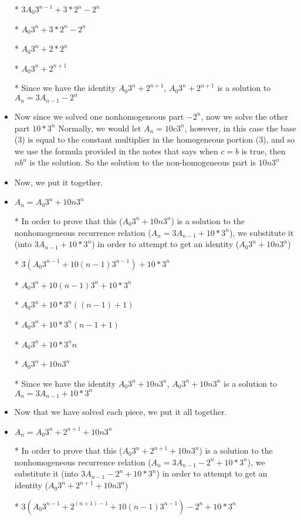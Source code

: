 \documentclass{article}
\begin{document}
\begin{enumerate}
\begin{enumerate}
\begin{itemize}
    \item [*] $3A_{0}3^{n-1}+3*2^{n}-2^{n}$
    \item [*] $A_{0}3^{n}+3*2^{n}-2^{n}$
    \item [*] $A_{0}3^{n}+2*2^{n}$
    \item [*] $A_{0}3^{n}+2^{n+1}$
    \item [*] Since we have the identity $A_{0}3^{n}+2^{n+1}$, $A_{0}3^{n}+2^{n+1}$ is a solution to $A_{n}=3A_{n-1}-2^{n}$
    \item Now since we solved one nonhomogeneous part $-2^{n}$, now we solve the other part $10*3^{n}$ Normally, we would let $A_{n}=10c3^{n}$, however, in this case the base ($3$) is equal to the constant multiplier in the homogeneous portion ($3$), and so we use the formula provided in the notes that says when $c=b$ is true, then $nb^{n}$ is the solution. So the solution to the non-homogeneous part is $10n3^{n}$
    \item Now, we put it together.
    \item $A_{n}=A_{0}3^{n}+10n3^{n}$
    \item [*] In order to prove that this ($A_{0}3^{n}+10n3^{n}$) is a solution to the nonhomogeneous recurrence relation ($A_{n}=3A_{n-1}+10*3^{n}$), we substitute it (into $3A_{n-1}+10*3^{n}$) in order to attempt to get an identity ($A_{0}3^{n}+10n3^{n}$)
    \item [*] $3(A_{0}3^{n-1}+10(n-1)3^{n-1})+10*3^{n}$
    \item [*] $A_{0}3^{n}+10(n-1)3^{n}+10*3^{n}$
    \item [*] $A_{0}3^{n}+10*3^{n}((n-1)+1)$
    \item [*] $A_{0}3^{n}+10*3^{n}(n-1+1)$
    \item [*] $A_{0}3^{n}+10*3^{n}n$
    \item [*] $A_{0}3^{n}+10n3^{n}$
    \item [*] Since we have the identity $A_{0}3^{n}+10n3^{n}$, $A_{0}3^{n}+10n3^{n}$ is a solution to $A_{n}=3A_{n-1}+10*3^{n}$
    \item Now that we have solved each piece, we put it all together.
    \item $A_{n}=A_{0}3^{n}+2^{n+1}+10n3^{n}$
    \item [*] In order to prove that this ($A_{0}3^{n}+2^{n+1}+10n3^{n}$) is a solution to the nonhomogeneous recurrence relation ($A_{n}=3A_{n-1}-2^{n}+10*3^{n}$), we substitute it (into $3A_{n-1}-2^{n}+10*3^{n}$) in order to attempt to get an identity ($A_{0}3^{n}+2^{n+1}+10n3^{n}$)
    \item [*] $3(A_{0}3^{n-1}+2^{(n+1)-1}+10(n-1)3^{n-1})-2^{n}+10*3^{n}$

\end{itemize}
\end{enumerate}
\end{enumerate}
\end{document}
